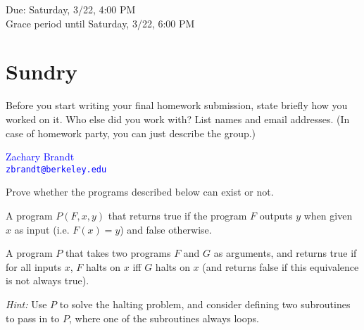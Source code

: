 \documentclass[11pt]{article}
\begin{document}
\maketitle
\fontsize{12}{15}\selectfont

\begin{center}
    Due: Saturday, 3/22, 4:00 PM \\
    Grace period until Saturday, 3/22, 6:00 PM \\
\end{center}

\section*{Sundry}
Before you start writing your final homework submission, state briefly how you worked on it.  Who else did you work with?  List names and email addresses.  (In case of homework party, you can just describe the group.)

\begin{center}
    \textcolor{blue}{
        Zachary Brandt \\
        \nolinkurl{zbrandt@berkeley.edu}
    }
\end{center}

\vspace{15pt}


Prove whether the programs described below can exist or not.

\begin{Parts}

\Part A program $P(F,x,y)$ that returns true if the program $F$ outputs $y$ when given $x$ as input (i.e. $F(x)=y$) and false otherwise.

\Part A program $P$ that takes two programs $F$ and $G$ as arguments, and returns true if for all inputs $x$, $F$ halts on $x$ iff $G$ halts on $x$ (and returns false if this equivalence is not always true).

\textit{Hint:} Use $P$ to solve the halting problem, and consider defining two subroutines to pass in to $P$, where one of the subroutines always loops.

\end{Parts}
\end{document}
